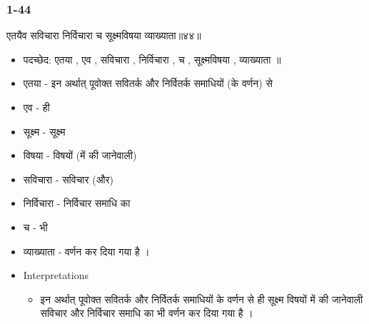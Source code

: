 \begin{frame}[fragile]\frametitle{1-44}
\begin{sanskrit}
एतयैव सविचारा निर्विचारा च सूक्ष्मविषया व्याख्याता॥४४॥
\end{sanskrit}

	\begin{itemize}
	\item पदच्छेद: एतया , एव , सविचारा , निर्विचारा , च , सूक्ष्मविषया , व्याख्याता ॥
	\item एतया - इन अर्थात् पूवोक्त सवितर्क और निर्वितर्क समाधियों (के वर्णन) से
	\item एव - ही
	\item सूक्ष्म - सूक्ष्म
	\item विषया - विषयों (में की जानेवाली)
	\item सविचारा - सविचार (और)
	\item निर्विचारा - निर्विचार समाधि का
	\item च - भी
	\item व्याख्याता - वर्णन कर दिया गया है ।
	\item Interpretations
		\begin{itemize}
		\item इन अर्थात् पूवोक्त सवितर्क और निर्वितर्क समाधियों के वर्णन से ही सूक्ष्म विषयों में की जानेवाली सविचार और निर्विचार समाधि का भी वर्णन कर दिया गया है ।
		\end{itemize}
	\end{itemize}
	
\end{frame}

